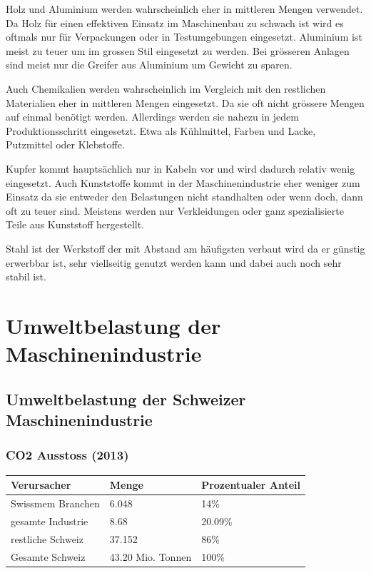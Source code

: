 Holz und Aluminium werden wahrscheinlich eher in mittleren Mengen
verwendet.  Da Holz für einen effektiven Einsatz im Maschinenbau zu
schwach ist wird es oftmals nur für Verpackungen oder in
Testumgebungen eingesetzt. Aluminium ist meist zu teuer um im grossen
Stil eingesetzt zu werden. Bei grösseren Anlagen sind meist nur die
Greifer aus Aluminium um Gewicht zu sparen.

Auch Chemikalien werden wahrscheinlich im Vergleich mit den restlichen
Materialien eher in mittleren Mengen eingesetzt. Da sie oft nicht
grössere Mengen auf einmal benötigt werden.  Allerdings werden sie
nahezu in jedem Produktionsschritt eingesetzt. Etwa als Kühlmittel,
Farben und Lacke, Putzmittel oder Klebstoffe.

Kupfer kommt hauptsächlich nur in Kabeln vor und wird dadurch relativ
wenig eingesetzt. Auch Kunststoffe kommt in der Maschinenindustrie
eher weniger zum Einsatz da sie entweder den Belastungen nicht
standhalten oder wenn doch, dann oft zu teuer sind. Meistens
werden nur Verkleidungen oder ganz spezialisierte Teile aus Kunststoff
hergestellt.

Stahl ist der Werkstoff der mit Abstand am häufigsten verbaut wird da
er günstig erwerbbar ist, sehr viellseitig genutzt werden kann und dabei
auch noch sehr stabil ist.

\section{Umweltbelastung der Maschinenindustrie}
\label{sec:org0cab5a7}
\subsection{Umweltbelastung der Schweizer Maschinenindustrie}
\label{sec:orgc2f69bd}
\subsubsection{CO2 Ausstoss (2013)}
\label{sec:org9e7c3fd}
\begin{center}
\begin{tabular}{lll}
Verursacher & Menge & Prozentualer Anteil\\
\hline
Swissmem Branchen & 6.048 & 14\% \cite{ref1}\\
gesamte Industrie & 8.68 \cite{ref6} & 20.09\%\\
restliche Schweiz & 37.152 & 86\% \cite{ref1}\\
\hline
Gesamte Schweiz & 43.20 Mio. Tonnen \cite{ref6} & 100\%\\
\end{tabular}

\end{center}

